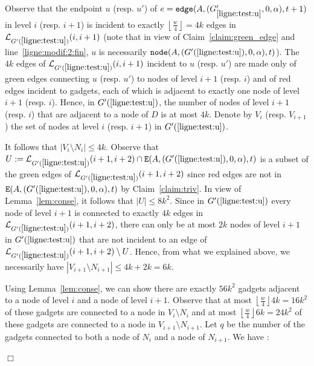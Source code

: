 \documentclass[11pt]{article}
\newcommand{\qed}{\hfill $\Box$ \bigbreak}
\newenvironment{proof}{\noindent {\bf Proof.}}{\qed}
\begin{document}
{\begin{proof}
Observe that the endpoint $u$ (resp. $u'$) of $e={\tt edge}(A,(G'_{\ref{ligne:test:u}},0,\alpha),t+1)$ in level $i$ (resp. $i+1$) is incident to exactly $\left\lfloor\frac{w}{4}\right\rfloor=4k$ edges in $\mathcal{L}_{G'(\ref{ligne:test:u})}(i,i+1)$ (note that in view of Claim~\ref{claim:green_edge} and line~\ref{ligne:modif:2:fin}, $u$ is necessarily ${\tt node}(A,(G'(\ref{ligne:test:u}),0,\alpha),t)$). The $4k$ edges of $\mathcal{L}_{G'(\ref{ligne:test:u})}(i,i+1)$ incident to $u$ (resp. $u'$) are made only of green edges connecting $u$ (resp. $u'$) to nodes of level $i+1$ (resp. $i$) and of red edges incident to gadgets, each of which is adjacent to exactly one node of level $i+1$ (resp. $i$). Hence, in $G'(\ref{ligne:test:u})$, the number of nodes of level $i+1$ (resp. $i$) that are adjacent to a node of $D$ is at most $4k$. Denote by $V_i$ (resp. $V_{i+1}$) the set of nodes at level $i$ (resp. $i+1$) in $G'(\ref{ligne:test:u})$.


It follows that $|V_i\setminus N_i|\leq 4k$. 
Observe that $U:=\mathcal{L}_{G'(\ref{ligne:test:u})}(i+1,i+2)\cap {\tt E}(A,(G'(\ref{ligne:test:u}),0,\alpha),t)$ is a subset of the green edges of $\mathcal{L}_{G'(\ref{ligne:test:u})}(i+1,i+2)$ since red edges are not in ${\tt E}(A,(G'(\ref{ligne:test:u}),0,\alpha),t)$ by Claim~\ref{claim:triv}. In view of Lemma~\ref{lem:conse}, it follows that $|U|\leq 8k^2$. Since in $G'(\ref{ligne:test:u})$ every node of level $i+1$ is connected to exactly $4k$ edges in  $\mathcal{L}_{G'(\ref{ligne:test:u})}(i+1,i+2)$, there can only be at most $2k$ nodes of level $i+1$ in $G'(\ref{ligne:test:u})$ that are not incident to an edge of $\mathcal{L}_{G'(\ref{ligne:test:u})}(i+1,i+2)\setminus U$. Hence, from what we explained above, we necessarily have $|V_{i+1}\setminus N_{i+1}|\leq 4k +2k = 6k$.

Using Lemma~\ref{lem:conse}, we can show there are exactly $56k^2$ gadgets adjacent to a node of level $i$ and a node of level $i+1$. Observe that at most $\left\lfloor\frac{w}{4}\right\rfloor 4k =16k^2$ of these gadgets are connected to a node in $V_i\setminus N_i$ and at most $\left\lfloor\frac{w}{4}\right\rfloor 6k = 24k^2$ of these gadgets are connected to a node in $V_{i+1}\setminus N_{i+1}$. 
Let $q$ be the number of the gadgets connected to both a node of $N_{i}$ and a node of $N_{i+1}$.
We have :


\end{proof}}
\end{document}
